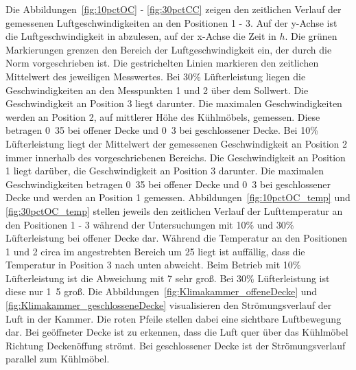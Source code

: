 Die Abbildungen~\ref{fig:10pctOC} - \ref{fig:30pctCC} zeigen den zeitlichen Verlauf der gemessenen Luftgeschwindigkeiten an den Positionen 1 - 3. Auf der y-Achse ist die Luftgeschwindigkeit in \unit{}{\metre\per\second} abzulesen, auf der x-Achse die Zeit in $h$. Die grünen Markierungen grenzen den Bereich der Luftgeschwindigkeit ein, der durch die Norm vorgeschrieben ist. Die gestrichelten Linien markieren den zeitlichen Mittelwert des jeweiligen Messwertes. \newline
Bei \unit{30}{\%} Lüfterleistung liegen die Geschwindigkeiten an den Messpunkten 1 und 2 über dem Sollwert. Die Geschwindigkeit an Position 3 liegt darunter. Die maximalen Geschwindigkeiten werden an Position 2, auf mittlerer Höhe des Kühlmöbels, gemessen. Diese betragen \unit{0.35}{\metre\per\second} bei offener Decke und \unit{0.3}{\metre\per\second} bei geschlossener Decke. 
Bei \unit{10}{\%} Lüfterleistung liegt der Mittelwert der gemessenen Geschwindigkeit an Position 2 immer innerhalb des vorgeschriebenen Bereichs. Die Geschwindigkeit an Position 1 liegt darüber, die Geschwindigkeit an Position 3 darunter. Die maximalen Geschwindigkeiten betragen \unit{0.35}{\metre\per\second} bei offener Decke und \unit{0.3}{\metre\per\second} bei geschlossener Decke und werden an Position 1 gemessen. \newline
Abbildungen~\ref{fig:10pctOC_temp} und \ref{fig:30pctOC_temp} stellen jeweils den zeitlichen Verlauf der Lufttemperatur an den Positionen 1 - 3 während der Untersuchungen mit \unit{10}{\%} und \unit{30}{\%} Lüfterleistung bei offener Decke dar.
Während die Temperatur an den Positionen 1 und 2 circa im angestrebten Bereich um \unit{25}{\celsius} liegt ist auffällig, dass die Temperatur in Position 3 nach unten abweicht. Beim Betrieb mit \unit{10}{\%} Lüfterleistung ist die Abweichung mit \unit{7}{\kelvin} sehr groß. Bei \unit{30}{\%} Lüfterleistung ist diese nur \unit{1.5}{\kelvin} groß. \newline
Die Abbildungen~\ref{fig:Klimakammer_offeneDecke} und \ref{fig:Klimakammer_geschlosseneDecke} visualisieren den Strömungsverlauf der Luft in der Kammer. Die roten Pfeile stellen dabei eine sichtbare Luftbewegung dar.
Bei geöffneter Decke ist zu erkennen, dass die Luft quer über das Kühlmöbel Richtung Deckenöffung strömt. Bei geschlossener Decke ist der Strömungsverlauf parallel zum Kühlmöbel.




